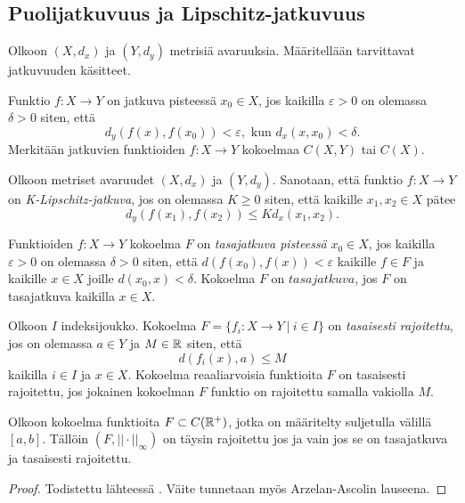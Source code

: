 \documentclass[12pt,oneside,a4paper]{amsbook} %
\begin{document}
\subsection{Puolijatkuvuus ja Lipschitz-jatkuvuus}
Olkoon $(X, d_x)$ ja $(Y, d_y)$ metrisiä avaruuksia. Määritellään tarvittavat jatkuvuuden käsitteet.

\begin{definition}Funktio $f: X \to Y$ on jatkuva pisteessä $x_0 \in X$, jos kaikilla $\varepsilon > 0$ on olemassa $\delta > 0$ siten, että
\begin{equation*}
    d_y(f(x), f(x_0)) < \varepsilon, \text{ kun } d_x(x, x_0) < \delta.
\end{equation*}
Merkitään jatkuvien funktioiden $f: X \to Y$ kokoelmaa $C(X, Y)$ tai $C(X)$.
\end{definition}

\begin{definition}
    Olkoon metriset avaruudet $(X, d_x)$ ja $(Y, d_y)$. Sanotaan, että funktio  ${f:X\to Y}$ on \textit{K-Lipschitz-jatkuva}, jos on olemassa $K\ge 0$ siten, että kaikille $x_1,x_2 \in X$ pätee
    $$d_y(f(x_1),f(x_2)) \le Kd_x(x_1,x_2).$$
\end{definition}

\begin{definition}
Funktioiden $f:X \to Y$ kokoelma $F$ on \textit{tasajatkuva pisteessä} $x_0 \in X$, jos kaikilla $\varepsilon > 0 $ on olemassa $\delta > 0$ siten, että $d(f(x_0), f(x)) < \varepsilon$ kaikille $f \in F$ ja kaikille $x \in X$ joille $d(x_0, x) < \delta $. Kokoelma $F$ on $tasajatkuva$, jos $F$ on tasajatkuva kaikilla $x \in X$.
\end{definition}

\begin{definition}
    Olkoon $I$ indeksijoukko. Kokoelma $F = \{f_i : X \to Y \ | \ i \in I\}$ on \textit{tasaisesti rajoitettu}, jos on olemassa $a \in Y$ ja $M \in \mathbb{R}$ siten, että
    \begin{equation*}
        d(f_i(x), a) \le M
    \end{equation*} 
    kaikilla $i \in I$ ja $x \in X$.
    Kokoelma reaaliarvoisia funktioita $F$ on tasaisesti rajoitettu, jos jokainen kokoelman $F$ funktio on rajoitettu samalla vakiolla $M$.
\end{definition}

\begin{theorem}\label{thm:ascoli-arzela}
    Olkoon kokoelma funktioita $F \subset C({\mathbb{R}^{+}})$, jotka on määritelty suljetulla välillä $[a, b]$. Tällöin $(F, ||\cdot||_\infty)$ on täysin rajoitettu jos ja vain jos se on tasajatkuva ja tasaisesti rajoitettu.
\end{theorem}
\begin{proof}
    Todistettu lähteessä \cite[s. 158]{rudin}. Väite tunnetaan myös Arzelan-Ascolin lauseena.
\end{proof}
\end{document}

